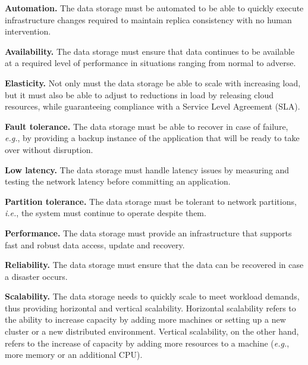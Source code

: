 \noindent
\textbf{Automation.} The data storage must be automated to be able to quickly execute infrastructure changes required to maintain replica consistency with no human intervention.

\noindent
\textbf{Availability.} The data storage must ensure that data continues to be available at a required level of performance in situations ranging from normal to adverse.

\noindent
\textbf{Elasticity.} Not only must the data storage be able to scale with increasing load, but it must also be able to adjust to reductions in load by releasing cloud resources, while guaranteeing compliance with a Service Level Agreement (SLA).

\noindent
\textbf{Fault tolerance.} The data storage must be able to recover in case of failure, \emph{e.g.}, by providing a backup instance of the application that will be ready to take over without disruption.

\noindent
\textbf{Low latency.} The data storage must handle latency issues by measuring and testing the network latency before committing an application. 

\noindent
\textbf{Partition  tolerance.} The data storage must be tolerant to  network partitions, \emph{i.e.}, the system must continue to operate despite them. %

\noindent
\textbf{Performance.} The data storage must provide an infrastructure that supports fast and robust data access, update and recovery.

\noindent
\textbf{Reliability.} The data storage must ensure that the data can be recovered in case a disaster occurs.

\noindent
\textbf{Scalability.} The data storage needs to quickly scale to meet workload demands, thus providing horizontal and vertical scalability. Horizontal scalability  refers to the ability to increase capacity by adding more machines or setting up a new cluster or a new distributed environment. Vertical scalability, on the other hand, refers to the increase of capacity by adding more resources %
to a machine (\emph{e.g.}, more memory or an additional CPU).



